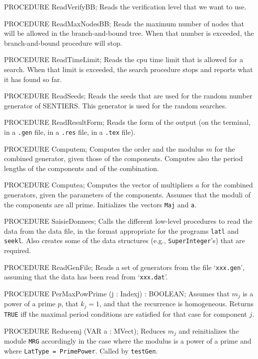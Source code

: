 PROCEDURE ReadVerifyBB;
\endcode
 \tab
  Reads the verification level that we want to use.
 \endtab
\code

PROCEDURE ReadMaxNodesBB;
\endcode
 \tab
  Reads the maximum number of nodes that will be allowed in
  the branch-and-bound tree.  When that number is exceeded,
  the branch-and-bound procedure will stop.
 \endtab
\code

PROCEDURE ReadTimeLimit;
\endcode
 \tab
  Reads the cpu time limit that is allowed for a search.
  When that limit is exceeded, the search procedure stops
  and reports what it has found so far.
 \endtab
\code

PROCEDURE ReadSeeds;
\endcode
 \tab
  Reads the seeds that are used for the random number generator
  of SENTIERS.  This generator is used for the random searches.
 \endtab
\code

PROCEDURE ReadResultForm;
\endcode
 \tab
  Reads the form of the output (on the terminal, in a {\tt .gen} file,
  in a {\tt .res} file, in a {\tt .tex} file).
 \endtab
\code

PROCEDURE Computem;
\endcode
 \tab  Computes the order and the modulus $m$ for the 
   combined generator, given those of the components.
   Computes also the period lengths of the components and of
   the combination.
 \endtab
\code

PROCEDURE Computea;
\endcode
 \tab 
   Computes the vector of multipliers $a$ for the combined generators,
   given the parameters of the components.
   Assumes that the moduli of the components are all prime.
   Initializes the vectors {\tt Maj} and {\tt a}. 
 \endtab
\code

PROCEDURE SaisieDonnees;
\endcode
 \tab
  Calls the different low-level procedures to read the data
  from the data file, in the format appropriate for the programs
  {\tt latl} and {\tt seekl}.
  Also creates some of the data structures (e.g., {\tt SuperInteger}'s)
  that are required.
 \endtab
\code

PROCEDURE ReadGenFile;
\endcode
 \tab
  Reads a set of generators from the file `{\tt xxx.gen}',
  assuming that the data has been read from `{\tt xxx.dat}'. 
 \endtab
\code

PROCEDURE PerMaxPowPrime (j : Indexj) : BOOLEAN;
\endcode
 \tab
   Assumes that $m_j$ is a power of a prime $p$, that $k_j = 1$, 
   and that the recurrence is homogeneous.   
   Returns {\tt TRUE} iff the maximal period conditions are 
   satisfied for that case for component $j$.
 \endtab
\code

PROCEDURE Reducemj (VAR a : MVect);
\endcode
 \tab
  Reduces $m_j$ and reinitializes the module {\tt MRG} accordingly
  in the case where the modulus is a power of a prime and where
  {\tt LatType = PrimePower}.  Called by {\tt testGen}.
 \endtab
\code

